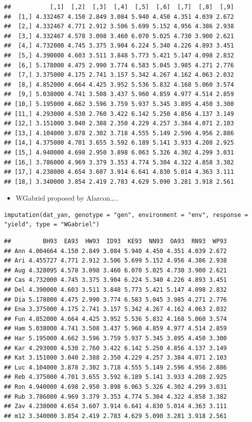 \begin{verbatim}
##           [,1]  [,2]  [,3]  [,4]  [,5]  [,6]  [,7]  [,8]  [,9]
##  [1,] 4.332467 4.150 2.849 3.084 5.940 4.450 4.351 4.039 2.672
##  [2,] 4.332467 4.771 2.912 3.506 5.699 5.152 4.956 4.386 2.938
##  [3,] 4.332467 4.578 3.098 3.460 6.070 5.025 4.730 3.900 2.621
##  [4,] 4.732000 4.745 3.375 3.904 6.224 5.340 4.226 4.893 3.451
##  [5,] 4.390000 4.603 3.511 3.848 5.773 5.421 5.147 4.098 2.832
##  [6,] 5.178000 4.475 2.990 3.774 6.583 5.045 3.985 4.271 2.776
##  [7,] 3.375000 4.175 2.741 3.157 5.342 4.267 4.162 4.063 2.032
##  [8,] 4.852000 4.664 4.425 3.952 5.536 5.832 4.168 5.060 3.574
##  [9,] 5.038000 4.741 3.508 3.437 5.960 4.859 4.977 4.514 2.859
## [10,] 5.195000 4.662 3.596 3.759 5.937 5.345 3.895 4.450 3.300
## [11,] 4.293000 4.530 2.760 3.422 6.142 5.250 4.856 4.137 3.149
## [12,] 3.151000 3.040 2.388 2.350 4.229 4.257 3.384 4.071 2.103
## [13,] 4.104000 3.878 2.302 3.718 4.555 5.149 2.596 4.956 2.886
## [14,] 4.375000 4.701 3.655 3.592 6.189 5.141 3.933 4.208 2.925
## [15,] 4.940000 4.698 2.950 3.898 6.063 5.326 4.302 4.299 3.031
## [16,] 3.786000 4.969 3.379 3.353 4.774 5.304 4.322 4.858 3.382
## [17,] 4.238000 4.654 3.607 3.914 6.641 4.830 5.014 4.363 3.111
## [18,] 3.340000 3.854 2.419 2.783 4.629 5.090 3.281 3.918 2.561
\end{verbatim}


\begin{itemize}
\item WGabriel proposed by Alarcon…..
\end{itemize}
\begin{lstlisting}
imputation(dat_yan, genotype = "gen", environment = "env", response = "yield", type = "WGabriel")
\end{lstlisting}

\begin{verbatim}
##         BH93  EA93  HW93  ID93  KE93  NN93  OA93  RN93  WP93
## Ann 4.004664 4.150 2.849 3.084 5.940 4.450 4.351 4.039 2.672
## Ari 4.455727 4.771 2.912 3.506 5.699 5.152 4.956 4.386 2.938
## Aug 4.328095 4.578 3.098 3.460 6.070 5.025 4.730 3.900 2.621
## Cas 4.732000 4.745 3.375 3.904 6.224 5.340 4.226 4.893 3.451
## Del 4.390000 4.603 3.511 3.848 5.773 5.421 5.147 4.098 2.832
## Dia 5.178000 4.475 2.990 3.774 6.583 5.045 3.985 4.271 2.776
## Ena 3.375000 4.175 2.741 3.157 5.342 4.267 4.162 4.063 2.032
## Fun 4.852000 4.664 4.425 3.952 5.536 5.832 4.168 5.060 3.574
## Ham 5.038000 4.741 3.508 3.437 5.960 4.859 4.977 4.514 2.859
## Har 5.195000 4.662 3.596 3.759 5.937 5.345 3.895 4.450 3.300
## Kar 4.293000 4.530 2.760 3.422 6.142 5.250 4.856 4.137 3.149
## Kat 3.151000 3.040 2.388 2.350 4.229 4.257 3.384 4.071 2.103
## Luc 4.104000 3.878 2.302 3.718 4.555 5.149 2.596 4.956 2.886
## Reb 4.375000 4.701 3.655 3.592 6.189 5.141 3.933 4.208 2.925
## Ron 4.940000 4.698 2.950 3.898 6.063 5.326 4.302 4.299 3.031
## Rub 3.786000 4.969 3.379 3.353 4.774 5.304 4.322 4.858 3.382
## Zav 4.238000 4.654 3.607 3.914 6.641 4.830 5.014 4.363 3.111
## m12 3.340000 3.854 2.419 2.783 4.629 5.090 3.281 3.918 2.561
\end{verbatim}

